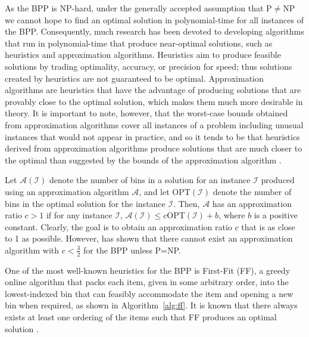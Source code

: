 \documentclass[a4paper,11pt]{article}
\begin{document}
\noindent As the BPP is NP-hard, under the generally accepted assumption that P$\neq$NP we cannot hope to find an optimal solution in polynomial-time for all instances of the BPP. Consequently, much research has been devoted to developing algorithms that run in polynomial-time that produce near-optimal solutions, such as heuristics and approximation algorithms. Heuristics aim to produce feasible solutions by trading optimality, accuracy, or precision for speed; thus solutions created by heuristics are not guaranteed to be optimal. Approximation algorithms are heuristics that have the advantage of producing solutions that are provably close to the optimal solution, which makes them much more desirable in theory. It is important to note, however, that the worst-case bounds obtained from approximation algorithms cover all instances of a problem including unusual instances that would not appear in practice, and so it tends to be that heuristics derived from approximation algorithms produce solutions that are much closer to the optimal than suggested by the bounds of the approximation algorithm \citep{williamson2011}.

Let $\mathcal{A}(\mathcal{I})$ denote the number of bins in a solution for an instance $\mathcal{I}$ produced using an approximation algorithm $\mathcal{A}$, and let OPT$(\mathcal{I})$ denote the number of bins in the optimal solution for the instance $\mathcal{I}$. Then, $\mathcal{A}$ has an approximation ratio $c>1$ if for any instance $\mathcal{I}$, $\mathcal{A}(\mathcal{I}) \leq c$OPT$(\mathcal{I}) + b$, where $b$ is a positive constant. Clearly, the goal is to obtain an approximation ratio $c$ that is as close to 1 as possible. However, \citet{vazirani2003} has shown that there cannot exist an approximation algorithm with $c < \frac{3}{2}$ for the BPP unless P=NP.

One of the most well-known heuristics for the BPP is First-Fit (FF), a greedy online algorithm that packs each item, given in some arbitrary order, into the lowest-indexed bin that can feasibly accommodate the item and opening a new bin when required, as shown in Algorithm~\ref{alg:ff}. It is known that there always exists at least one ordering of the items such that FF produces an optimal solution \citep{lewis2009}. 
\end{document}
